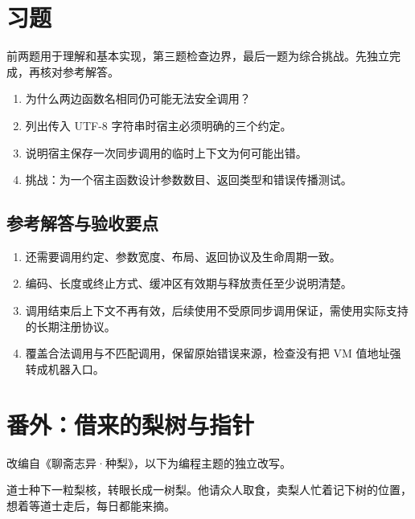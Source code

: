 \section{习题}

前两题用于理解和基本实现，第三题检查边界，最后一题为综合挑战。先独立完成，再核对参考解答。

\begin{enumerate}

\item 为什么两边函数名相同仍可能无法安全调用？

\item 列出传入 UTF-8 字符串时宿主必须明确的三个约定。

\item 说明宿主保存一次同步调用的临时上下文为何可能出错。

\item 挑战：为一个宿主函数设计参数数目、返回类型和错误传播测试。

\end{enumerate}

\subsection*{参考解答与验收要点}

\begin{enumerate}

\item 还需要调用约定、参数宽度、布局、返回协议及生命周期一致。

\item 编码、长度或终止方式、缓冲区有效期与释放责任至少说明清楚。

\item 调用结束后上下文不再有效，后续使用不受原同步调用保证，需使用实际支持的长期注册协议。

\item 覆盖合法调用与不匹配调用，保留原始错误来源，检查没有把 VM 值地址强转成机器入口。

\end{enumerate}

\section{番外：借来的梨树与指针}

改编自《聊斋志异·种梨》，以下为编程主题的独立改写。

道士种下一粒梨核，转眼长成一树梨。他请众人取食，卖梨人忙着记下树的位置，想着等道士走后，每日都能来摘。

